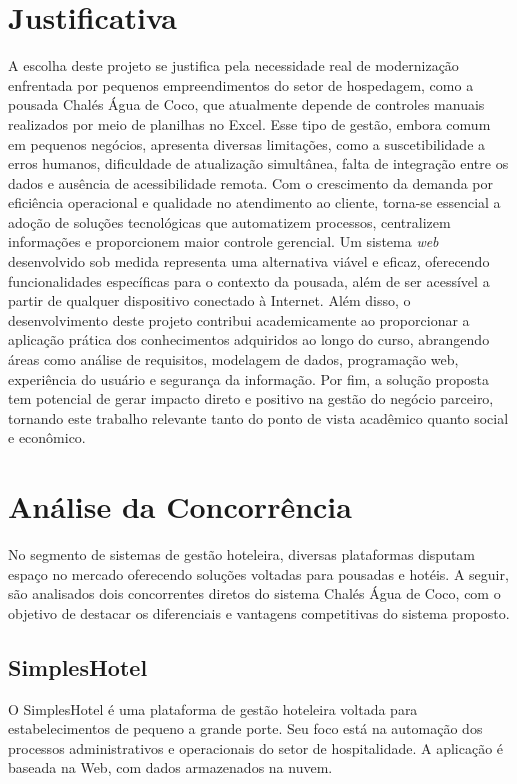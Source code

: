 \documentclass[
	12pt,				%
	openany,			%
	oneside,			%
	a4paper,			%
	english,			%
	french,				%
	spanish,			%
	brazil				%
	]{abntex2}
\begin{document}
\section{Justificativa} 
A escolha deste projeto se justifica pela necessidade real de modernização enfrentada por pequenos empreendimentos do setor de hospedagem, como a pousada Chalés Água de Coco, que atualmente depende de controles manuais realizados por meio de planilhas no Excel. 
Esse tipo de gestão, embora comum em pequenos negócios, apresenta diversas limitações, como a suscetibilidade a erros humanos, dificuldade de atualização simultânea, falta de integração entre os dados e ausência de acessibilidade remota. Com o crescimento da demanda por eficiência operacional e qualidade no atendimento ao cliente, torna-se essencial a adoção de soluções tecnológicas que automatizem processos, centralizem informações e proporcionem maior controle gerencial. 
Um sistema \textit{web} desenvolvido sob medida representa uma alternativa viável e eficaz, oferecendo funcionalidades específicas para o contexto da pousada, além de ser acessível a partir de qualquer dispositivo conectado à Internet. 
Além disso, o desenvolvimento deste projeto contribui academicamente ao proporcionar a aplicação prática dos conhecimentos adquiridos ao longo do curso, abrangendo áreas como análise de requisitos, modelagem de dados, programação web, experiência do usuário e segurança da informação. 
Por fim, a solução proposta tem potencial de gerar impacto direto e positivo na gestão do negócio parceiro, tornando este trabalho relevante tanto do ponto de vista acadêmico quanto social e econômico.

\section{Análise da Concorrência}
No segmento de sistemas de gestão hoteleira, diversas plataformas disputam espaço no mercado oferecendo soluções voltadas para pousadas e hotéis. A seguir, são analisados dois concorrentes diretos do sistema Chalés Água de Coco, com o objetivo de destacar os diferenciais e vantagens competitivas do sistema proposto.

\subsection{SimplesHotel}
O SimplesHotel é uma plataforma de gestão hoteleira voltada para estabelecimentos de pequeno a grande porte. Seu foco está na automação dos processos administrativos e operacionais do setor de hospitalidade. A aplicação é baseada na Web, com dados armazenados na nuvem.
\end{document}
